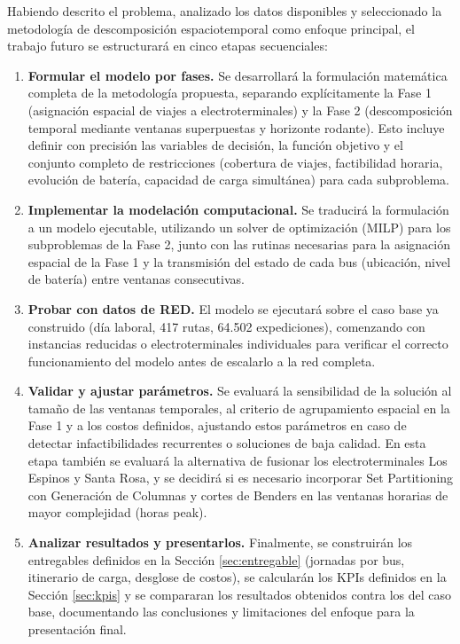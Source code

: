 Habiendo descrito el problema, analizado los datos disponibles y seleccionado la metodolog\'ia de descomposici\'on espaciotemporal como enfoque principal, el trabajo futuro se estructurar\'a en cinco etapas secuenciales:

\begin{enumerate}
\item \textbf{Formular el modelo por fases.} Se desarrollar\'a la formulaci\'on matem\'atica completa de la metodolog\'ia propuesta, separando expl\'icitamente la Fase 1 (asignaci\'on espacial de viajes a electroterminales) y la Fase 2 (descomposici\'on temporal mediante ventanas superpuestas y horizonte rodante). Esto incluye definir con precisi\'on las variables de decisi\'on, la funci\'on objetivo y el conjunto completo de restricciones (cobertura de viajes, factibilidad horaria, evoluci\'on de bater\'ia, capacidad de carga simult\'anea) para cada subproblema.
\item \textbf{Implementar la modelaci\'on computacional.} Se traducir\'a la formulaci\'on a un modelo ejecutable, utilizando un solver de optimizaci\'on (MILP) para los subproblemas de la Fase 2, junto con las rutinas necesarias para la asignaci\'on espacial de la Fase 1 y la transmisi\'on del estado de cada bus (ubicaci\'on, nivel de bater\'ia) entre ventanas consecutivas.
\item \textbf{Probar con datos de RED.} El modelo se ejecutar\'a sobre el caso base ya construido (d\'ia laboral, 417 rutas, 64.502 expediciones), comenzando con instancias reducidas o electroterminales individuales para verificar el correcto funcionamiento del modelo antes de escalarlo a la red completa.
\item \textbf{Validar y ajustar par\'ametros.} Se evaluar\'a la sensibilidad de la soluci\'on al tama\~no de las ventanas temporales, al criterio de agrupamiento espacial en la Fase 1 y a los costos definidos, ajustando estos par\'ametros en caso de detectar infactibilidades recurrentes o soluciones de baja calidad. En esta etapa tambi\'en se evaluar\'a la alternativa de fusionar los electroterminales Los Espinos y Santa Rosa, y se decidir\'a si es necesario incorporar Set Partitioning con Generaci\'on de Columnas y cortes de Benders en las ventanas horarias de mayor complejidad (horas peak).
\item \textbf{Analizar resultados y presentarlos.} Finalmente, se construir\'an los entregables definidos en la Secci\'on \ref{sec:entregable} (jornadas por bus, itinerario de carga, desglose de costos), se calcular\'an los KPIs definidos en la Secci\'on \ref{sec:kpis} y se compararan los resultados obtenidos contra los del caso base, documentando las conclusiones y limitaciones del enfoque para la presentaci\'on final.
\end{enumerate}

